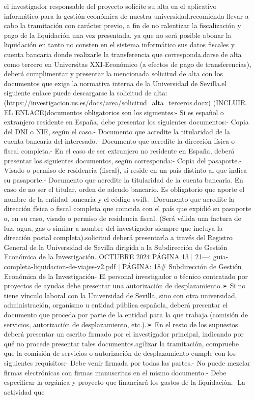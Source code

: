 \documentclass{article}
\begin{document}
\begin{itemize}
{{el investigador responsable del proyecto solicite su alta en el aplicativo informático para la gestión económica de nuestra universidad.\n\nSe recomienda llevar a cabo la tramitación con carácter previo, a fin de no ralentizar la fiscalización y pago de la liquidación una vez presentada, ya que no será posible abonar la liquidación en tanto no consten en el sistema informático sus datos fiscales y cuenta bancaria donde realizarle la transferencia que corresponda.\n\nPara darse de alta como tercero en Universitas XXI-Económico (a efectos de pago de transferencias), deberá cumplimentar y presentar la mencionada solicitud de alta con los documentos que exige la normativa interna de la Universidad de Sevilla.\n\nEn el siguiente enlace puede descargarse la solicitud de alta:\n{}(https://investigacion.us.es/docs/area/solicitud_alta_terceros.docx) (INCLUIR EL ENLACE)\n\nLos documentos obligatorios son los siguientes:\n\n- Si es español o extranjero residente en España, debe presentar los siguientes documentos:\n- Copia del DNI o NIE, según el caso.\n- Documento que acredite la titularidad de la cuenta bancaria del interesado.\n- Documento que acredite la dirección física o fiscal completa.\n\n- En el caso de ser extranjero no residente en España, deberá presentar los siguientes documentos, según corresponda:\n- Copia del pasaporte.\n- Visado o permiso de residencia (fiscal), si reside en un país distinto al que indica su pasaporte.\n- Documento que acredite la titularidad de la cuenta bancaria. En caso de no ser el titular, orden de adeudo bancario. Es obligatorio que aporte el nombre de la entidad bancaria y el código swift.\n- Documento que acredite la dirección física o fiscal completa que coincida con el país que expidió su pasaporte o, en su caso, visado o permiso de residencia fiscal. (Será válida una factura de luz, agua, gas o similar a nombre del investigador siempre que incluya la dirección postal completa).\n\nLa solicitud deberá presentarla a través del Registro General de la Universidad de Sevilla dirigida a la Subdirección de Gestión Económica de la Investigación.\n{} OCTUBRE 2024    PÁGINA 13 | 21\n\n---\n\nFUENTE: guia-completa-liquidacion-de-viajes-v2.pdf | PÁGINA: 18\n# Subdirección de Gestión Económica de la Investigación\n\n- El personal investigador o técnico contratado por proyectos de ayudas debe presentar una autorización de desplazamiento.\n\n➢ Si no tiene vínculo laboral con la Universidad de Sevilla, sino con otra universidad, administración, organismo u entidad pública española, deberá presentar el documento que proceda por parte de la entidad para la que trabaja (comisión de servicios, autorización de desplazamiento, etc.).\n\n➢ En el resto de los supuestos deberá presentar un escrito firmado por el investigador principal, indicando por qué no procede presentar tales documentos.\n\nPara agilizar la tramitación, compruebe que la comisión de servicios o autorización de desplazamiento cumple con los siguientes requisitos:\n\n- Debe venir firmada por todas las partes.\n- No puede mezclar firmas electrónicas con firmas manuscritas en el mismo documento.\n- Debe especificar la orgánica y proyecto que financiará los gastos de la liquidación.\n- La actividad que }}
\end{itemize}
\end{document}
